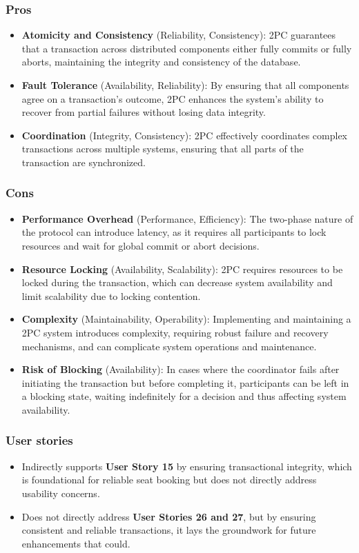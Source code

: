 \subsubsection*{Pros}
\begin{itemize}[noitemsep]
    \item \textbf{Atomicity and Consistency} (Reliability, Consistency): 2PC guarantees that a transaction across distributed components either fully commits or fully aborts, maintaining the integrity and consistency of the database.
    \item \textbf{Fault Tolerance} (Availability, Reliability): By ensuring that all components agree on a transaction's outcome, 2PC enhances the system's ability to recover from partial failures without losing data integrity.
    \item \textbf{Coordination} (Integrity, Consistency): 2PC effectively coordinates complex transactions across multiple systems, ensuring that all parts of the transaction are synchronized.
\end{itemize}

\subsubsection*{Cons}
\begin{itemize}[noitemsep]
    \item \textbf{Performance Overhead} (Performance, Efficiency): The two-phase nature of the protocol can introduce latency, as it requires all participants to lock resources and wait for global commit or abort decisions.
    \item \textbf{Resource Locking} (Availability, Scalability): 2PC requires resources to be locked during the transaction, which can decrease system availability and limit scalability due to locking contention.
    \item \textbf{Complexity} (Maintainability, Operability): Implementing and maintaining a 2PC system introduces complexity, requiring robust failure and recovery mechanisms, and can complicate system operations and maintenance.
    \item \textbf{Risk of Blocking} (Availability): In cases where the coordinator fails after initiating the transaction but before completing it, participants can be left in a blocking state, waiting indefinitely for a decision and thus affecting system availability.
\end{itemize}
\subsubsection*{User stories}
\begin{itemize}
    \item Indirectly supports \textbf{User Story 15} by ensuring transactional integrity, which is foundational for reliable seat booking but does not directly address usability concerns.
    \item Does not directly address \textbf{User Stories 26 and 27}, but by ensuring consistent and reliable transactions, it lays the groundwork for future enhancements that could.
\end{itemize}

